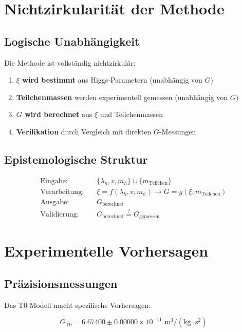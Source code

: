 \documentclass[12pt,a4paper]{article}
\begin{document}
	\section{Nichtzirkularität der Methode}
	
	\subsection{Logische Unabhängigkeit}
	
	Die Methode ist vollständig nichtzirkulär:
	
	\begin{enumerate}
		\item \textbf{$\xi$ wird bestimmt} aus Higgs-Parametern (unabhängig von $G$)
		\item \textbf{Teilchenmassen} werden experimentell gemessen (unabhängig von $G$)
		\item \textbf{$G$ wird berechnet} aus $\xi$ und Teilchenmassen
		\item \textbf{Verifikation} durch Vergleich mit direkten $G$-Messungen
	\end{enumerate}
	
	\subsection{Epistemologische Struktur}
	
	\begin{align}
		\text{Eingabe:} \quad &\{\lambda_h, v, m_h\} \cup \{m_{\text{Teilchen}}\}\\
		\text{Verarbeitung:} \quad &\xi = f(\lambda_h, v, m_h) \rightarrow G = g(\xi, m_{\text{Teilchen}})\\
		\text{Ausgabe:} \quad &G_{\text{berechnet}}\\
		\text{Validierung:} \quad &G_{\text{berechnet}} \stackrel{?}{=} G_{\text{gemessen}}
	\end{align}
	
	\section{Experimentelle Vorhersagen}
	
	\subsection{Präzisionsmessungen}
	
	Das T0-Modell macht spezifische Vorhersagen:
	
	\begin{equation}
		G_{\text{T0}} = 6.67400 \pm 0.00000 \times 10^{-11} \text{ m}^3/(\text{kg} \cdot \text{s}^2)
	\end{equation}
	
\end{document}
